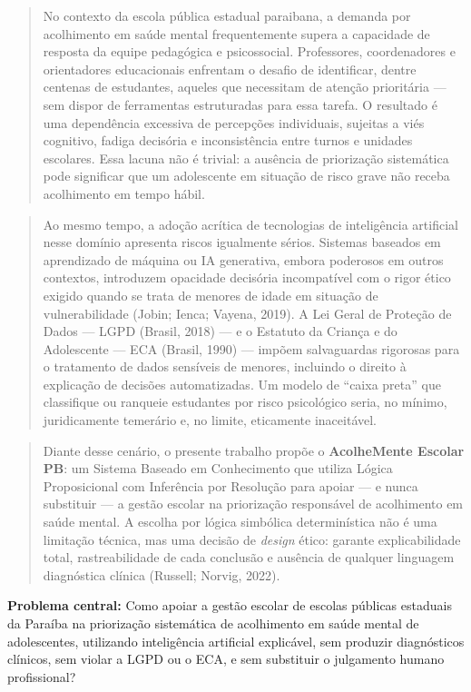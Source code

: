 \documentclass[11pt]{article}
\begin{document}
\begin{quote}
No contexto da escola pública estadual paraibana, a demanda por
acolhimento em saúde mental frequentemente supera a capacidade de
resposta da equipe pedagógica e psicossocial. Professores, coordenadores
e orientadores educacionais enfrentam o desafio de identificar, dentre
centenas de estudantes, aqueles que necessitam de atenção prioritária
--- sem dispor de ferramentas estruturadas para essa tarefa. O resultado
é uma dependência excessiva de percepções individuais, sujeitas a viés
cognitivo, fadiga decisória e inconsistência entre turnos e unidades
escolares. Essa lacuna não é trivial: a ausência de priorização
sistemática pode significar que um adolescente em situação de risco
grave não receba acolhimento em tempo hábil.
\end{quote}

\begin{quote}
Ao mesmo tempo, a adoção acrítica de tecnologias de inteligência
artificial nesse domínio apresenta riscos igualmente sérios. Sistemas
baseados em aprendizado de máquina ou IA generativa, embora poderosos em
outros contextos, introduzem opacidade decisória incompatível com o
rigor ético exigido quando se trata de menores de idade em situação de
vulnerabilidade (Jobin; Ienca; Vayena, 2019). A Lei Geral de Proteção de
Dados --- LGPD (Brasil, 2018) --- e o Estatuto da Criança e do
Adolescente --- ECA (Brasil, 1990) --- impõem salvaguardas rigorosas
para o tratamento de dados sensíveis de menores, incluindo o direito à
explicação de decisões automatizadas. Um modelo de ``caixa preta'' que
classifique ou ranqueie estudantes por risco psicológico seria, no
mínimo, juridicamente temerário e, no limite, eticamente inaceitável.
\end{quote}

\begin{quote}
Diante desse cenário, o presente trabalho propõe o \textbf{AcolheMente
Escolar PB}: um Sistema Baseado em Conhecimento que utiliza Lógica
Proposicional com Inferência por Resolução para apoiar --- e nunca
substituir --- a gestão escolar na priorização responsável de
acolhimento em saúde mental. A escolha por lógica simbólica
determinística não é uma limitação técnica, mas uma decisão de
\emph{design} ético: garante explicabilidade total, rastreabilidade de
cada conclusão e ausência de qualquer linguagem diagnóstica clínica
(Russell; Norvig, 2022).
\end{quote}

\textbf{Problema central:} Como apoiar a gestão escolar de escolas
públicas estaduais da Paraíba na priorização sistemática de acolhimento
em saúde mental de adolescentes, utilizando inteligência artificial
explicável, sem produzir diagnósticos clínicos, sem violar a LGPD ou o
ECA, e sem substituir o julgamento humano profissional?
\end{document}
